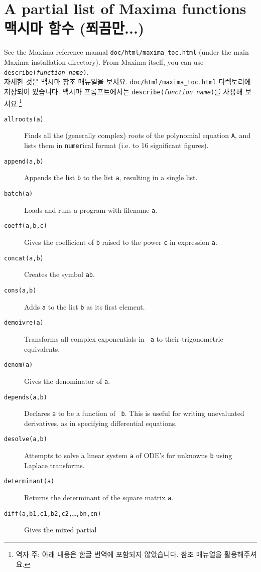 \documentclass[a4paper,12pt]{article}
\begin{document}
\section{A partial list of Maxima functions  \\ 맥시마 함수 (쬐끔만...) }

See the Maxima reference manual {\tt doc/html/maxima\_toc.html} (under 
the main Maxima installation directory). From Maxima itself, you can 
use {\tt describe(\textit{function name})}. \\
자세한 것은 맥시마 참조 매뉴얼을 보셔요. {\tt doc/html/maxima\_toc.html} 
디렉토리에 저장되어 있습니다. 맥시마 프롬프트에서는 
{\tt describe(\textit{function name})}를 사용해 보셔요.\footnote{역자 주: 
아래 내용은 한글 번역에 포함되지 않았습니다. 참조 매뉴얼을 활용해주셔요.}

\begin{description}
\item[{\tt allroots(a)}] Finds all the (generally complex) roots of
  the polynomial equation {\tt A}, and lists them in {\tt numer}ical
  format (i.e. to 16 significant figures).
\item[{\tt append(a,b)}] Appends the list {\tt b} to the list {\tt a},
  resulting in a single list.
\item[{\tt batch(a)}] Loads and runs a program with filename {\tt a}.
\item[{\tt coeff(a,b,c)}] Gives the coefficient of {\tt b} raised to
  the power {\tt c} in expression {\tt a}.
\item[{\tt concat(a,b)}] Creates the symbol {\tt ab}.
\item[{\tt cons(a,b)}] Adds {\tt a} to the list {\tt b} as its first element.
\item[{\tt demoivre(a)}] Transforms all complex exponentials in {\tt
    a} to their trigonometric equivalents.
\item[{\tt denom(a)}] Gives the denominator of {\tt a}.
\item[{\tt depends(a,b)}] Declares {\tt a} to be a function of {\tt
    b}.  This is useful for writing unevaluated derivatives, as in
  specifying differential equations.
\item[{\tt desolve(a,b)}] Attempts to solve a linear system {\tt a} of
  ODE's for unknowns {\tt b} using Laplace transforms.
\item[{\tt determinant(a)}] Returns the determinant of the square
  matrix {\tt a}.
\item[{\tt diff(a,b1,c1,b2,c2,\ldots,bn,cn)}] Gives the mixed partial

\end{description}
\end{document}
